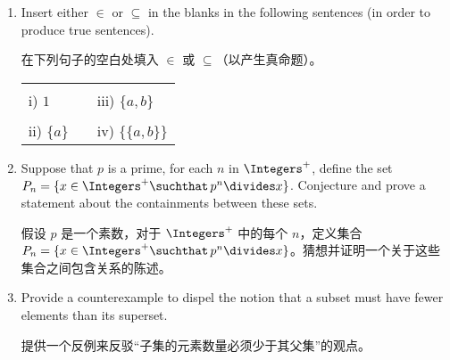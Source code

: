 \begin{enumerate}
    \item Insert either $\in$ or $\subseteq$ in the blanks in the following 
    sentences (in order to produce true sentences).
    
    在下列句子的空白处填入 $\in$ 或 $\subseteq$（以产生真命题）。
    \begin{tabular}{lcl}
    \rule{0pt}{16pt}i) $1$ \underline{\rule{36pt}{0pt}} $\{3, 2, 1, \{a, b\}\}$ & \rule{36pt}{0pt} & iii) $\{a, b\}$  \underline{\rule{36pt}{0pt}} $\{3, 2, 1, \{a, b\}\}$ \\
    \rule{0pt}{16pt}ii) $\{a\}$ \underline{\rule{36pt}{0pt}} $\{a, \{a, b\}\}$ & &
    iv) $\{\{a, b\}\}$  \underline{\rule{36pt}{0pt}} $\{a, \{a, b\}\}$ \\
    \end{tabular}
    
    \hint{$\in$, $\subseteq$, $\in$, $\subseteq$}
    
    \item  Suppose that $p$ is a prime, for each $n$ in $\Integers^+$, 
    define the set $P_n = \{ x \in \Integers^+ \suchthat \, p^n \divides x \}$.
    Conjecture and prove a statement about the containments between these sets.
    
    假设 $p$ 是一个素数，对于 $\Integers^+$ 中的每个 $n$，定义集合 $P_n = \{ x \in \Integers^+ \suchthat \, p^n \divides x \}$。猜想并证明一个关于这些集合之间包含关系的陈述。
    
    
    \wbvfill
    
    \item  Provide a counterexample to dispel the notion that a subset must
    have fewer elements than its superset.
    
    提供一个反例来反驳“子集的元素数量必须少于其父集”的观点。
\end{enumerate}
